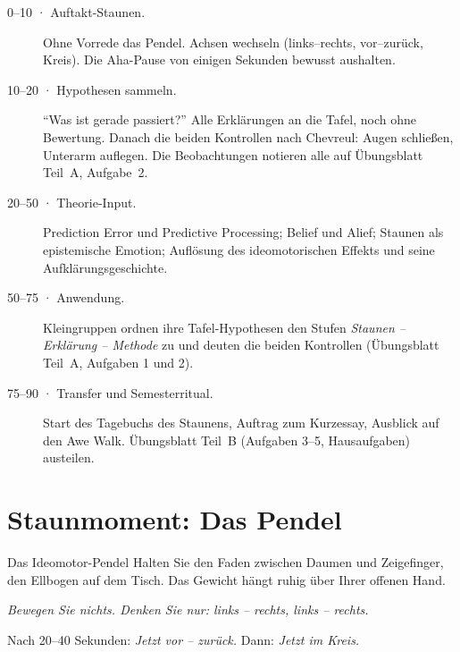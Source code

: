 \begin{ablauf}
\begin{description}
\item[0--10 · Auftakt-Staunen.] Ohne Vorrede das Pendel. Achsen
  wechseln (links--rechts, vor--zurück, Kreis). Die Aha-Pause von einigen
  Sekunden bewusst aushalten.
\item[10--20 · Hypothesen sammeln.] \enquote{Was ist gerade passiert?}
  Alle Erklärungen an die Tafel, noch ohne Bewertung. Danach die beiden
  Kontrollen nach Chevreul: Augen schließen, Unterarm auflegen. Die
  Beobachtungen notieren alle auf Übungsblatt Teil~A, Aufgabe~2.
\item[20--50 · Theorie-Input.] Prediction Error und Predictive Processing;
  Belief und Alief; Staunen als epistemische Emotion; Auflösung des
  ideomotorischen Effekts und seine Aufklärungsgeschichte.
\item[50--75 · Anwendung.] Kleingruppen ordnen ihre Tafel-Hypothesen den
  Stufen \emph{Staunen -- Erklärung -- Methode} zu und deuten die beiden
  Kontrollen (Übungsblatt Teil~A, Aufgaben 1 und 2).
\item[75--90 · Transfer und Semesterritual.] Start des Tagebuchs des
  Staunens, Auftrag zum Kurzessay, Ausblick auf den Awe Walk. Übungsblatt
  Teil~B (Aufgaben 3--5, Hausaufgaben) austeilen.
\end{description}
\end{ablauf}

\section{Staunmoment: Das Pendel}
\begin{staunbox}{Das Ideomotor-Pendel}
Halten Sie den Faden zwischen Daumen und Zeigefinger, den Ellbogen auf dem
Tisch. Das Gewicht hängt ruhig über Ihrer offenen Hand.

\emph{Bewegen Sie nichts. Denken Sie nur: links -- rechts, links -- rechts.}

\medskip
Nach 20--40 Sekunden: \emph{Jetzt vor -- zurück.} \quad
Dann: \emph{Jetzt im Kreis.}
\end{staunbox}
\os{\newpage}

